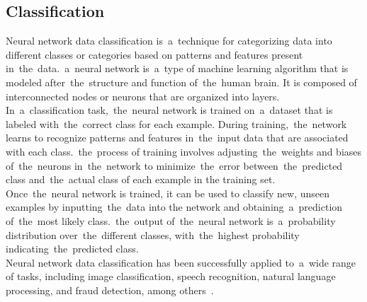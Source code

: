 \subsection{Classification} \label{subsec:clasification}
Neural network data classification is~a~technique for categorizing data into different classes or categories based on
patterns and features present in~the~data.~a~neural network is~a~type of machine learning algorithm that is modeled
after~the~structure and function of~the~human brain. It is composed of interconnected nodes or neurons that are
organized into layers.\\
In~a~classification task,~the~neural network is trained on~a~dataset that is labeled with~the~correct
class for each example. During training,~the~network learns to recognize patterns and features in~the~input data
that are associated with each class.~the~process of training involves adjusting~the~weights and biases of~the~neurons
in~the~network to minimize~the~error between~the~predicted class and~the~actual class of each example in the
training set.\\
Once~the~neural network is trained, it can be used to classify new, unseen examples by inputting~the~data into
the network and obtaining~a~prediction of~the~most likely class.~the~output of~the~neural network is~a~probability
distribution over~the~different classes, with~the~highest probability indicating~the~predicted class.\\
Neural network data classification has been successfully applied to~a~wide range of tasks, including image
classification, speech recognition, natural language processing, and fraud detection, among others~\cite{feraud2002methodology}.

